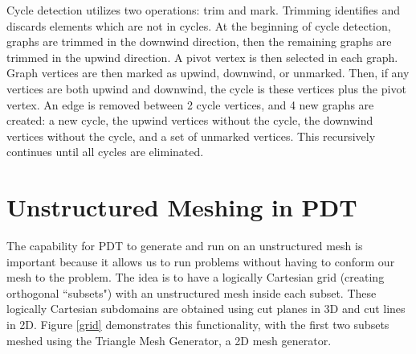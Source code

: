\documentclass[11pt, letterpaper,titlepage,oneside]{article}
\begin{document}
Cycle detection utilizes two operations: trim and mark. Trimming identifies and discards elements which are not in cycles. At the beginning of cycle detection, graphs are trimmed in the downwind direction, then the remaining graphs are trimmed in the upwind direction. A pivot vertex is then selected in each graph. Graph vertices are then marked as upwind, downwind, or unmarked. Then, if any vertices are both upwind and downwind, the cycle is these vertices plus the pivot vertex. An edge is removed between 2 cycle vertices, and 4 new graphs are created: a new cycle, the upwind vertices without the cycle, the downwind vertices without the cycle, and a set of unmarked vertices. This recursively continues until all cycles are eliminated.

\section{Unstructured Meshing in PDT}

The capability for PDT to generate and run on an unstructured mesh is important because it allows us to run problems without having to conform our mesh to the problem. The idea is to have a logically Cartesian grid (creating orthogonal ``subsets") with an unstructured mesh inside each subset. These logically Cartesian subdomains are obtained using cut planes in 3D and cut lines in 2D. Figure \ref{grid} demonstrates this functionality, with the first two subsets meshed using the Triangle Mesh Generator\cite{triangle}, a 2D mesh generator. 
\end{document}
